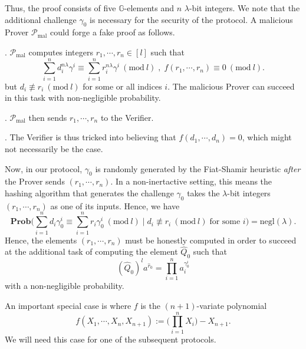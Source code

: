 \documentclass[11pt, lettersize, notitlepage, leqno, footskip=0.6cm]{article}
\newcommand{\pl}{\prod\limits}
\newcommand{\slim}{\sum\limits}
\newcommand{\negl}{\mr{negl}}
\newcommand{\mc}{\mathcal}
\newcommand{\mb}{\mathbb}
\newcommand{\mbf}{\mathbf}
\newcommand{\mr}{\mathrm}
\newcommand{\lam}{\lambda}
\newcommand{\what}{\widehat}
\newcommand{\Prob}{\mbf{Prob}}
\newcommand{\mP}{\mc{P}}
\newcommand{\vs}{\vspace{-0.15cm}}
\newcommand{\noin}{\noindent}
\newcommand{\Mod}[1]{\ (\mathrm{mod}\ #1)}
\numberwithin{equation}{section}
\begin{document}
\vspace{0.1cm}

Thus, the proof consists of five $\mb{G}$-elements and $n$ $\lam$-bit integers. We note that the additional challenge $\gamma_0$ is necessary for the security of the protocol. A malicious Prover $\mP_{\mr{mal}}$ could forge a fake proof as follows.

\noin 1. $\mP_{\mr{mal}}$ computes integers $r_1,\cdots,r_n\in[l]$ such that \vs $$ \slim_{i=1}^n d_i^{n\lam}\gamma^i\equiv\slim_{i=1}^n r_i^{n\lam}\gamma^i\Mod{l} \;,\;f(r_1,\cdots,r_n) \equiv 0\Mod{l}.$$ but $d_i\not\equiv r_i\Mod{l}$ for some or all indices $i$. The malicious Prover can succeed in this task with non-negligible probability.

\noin 2. $\mP_{\mr{mal}}$ then sends $r_1,\cdots,r_n$ to the Verifier.

\noin 3. The Verifier is thus tricked into believing that $f(d_1,\cdots,d_n) = 0$, which might not necessarily be the case.

Now, in our protocol, $\gamma_0$ is randomly generated by the Fiat-Shamir heuristic \textit{after} the Prover sends $(r_1,\cdots,r_n)$. In a non-inertactive setting, this means the hashing algorithm that generates the challenge $\gamma_0$ takes the $\lam$-bit integers $(r_1,\cdots,r_n)$ as one of its inputs. Hence, we have \vs $$\Prob\Big(\slim_{i=1}^n d_i\gamma_0^i \equiv \slim_{i=1}^n r_i\gamma_0^i \Mod{l}\;\Big|\; d_i\not\equiv r_i\Mod{l}\;\text{for some } i\Big) = \negl(\lam). $$ Hence, the elements $(r_1,\cdots,r_n)$ must be honestly computed in order to succeed at the additional task of computing the element $\what{Q}_0$ such that \vs $$(\what{Q}_0)^la^{\what{r}_0} = \pl_{i=1}^{n} a_i^{\gamma_0^i} $$ with a non-negligible probability.

\begin{comment} Although the proof is linear in size because of the $\lam$-bit integers $r_1,\cdots,r_n$, the number of $\mb{G}$-elements in this proof is constant. Since the group elements are much larger than $\lam$-bits, the communication complexity is substantially smaller that sending over $n$ separate arguments of knowledge. For instance, when $\lam = 128$, the group elements are of bit-size $3072$ with a RSA group, $6656$-bits with an imaginary quadratic class group and $3300$-bits with a Jacobian of a genus three hyperelliptic curve.\end{comment}

An important special case is where $f$ is the $(n+1)$-variate polynomial \vs $$f(X_1,\cdots,X_n, X_{n+1}) := \big(\pl_{i=1}^n X_i \big)- X_{n+1}.$$ We will need this case for one of the subsequent protocols. \vspace{0.2cm}
\end{document}

